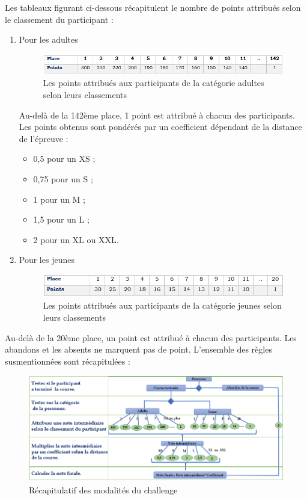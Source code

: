 	Les tableaux figurant ci-dessous récapitulent le nombre de points attribués selon le classement du participant :
	\begin{enumerate}
	   \item Pour les adultes
	\begin{figure}[h!]
	   \center
	   \includegraphics[scale=0.9]{img/points_categorie_adultes.png}
	   \caption {Les points attribués aux participants de la catégorie adultes selon leurs classements}
	\end{figure}
	
	Au-delà de la 142ème place, 1 point est attribué à chacun des participants. Les points obtenus sont pondérés par un coefficient dépendant de la distance de l’épreuve : 
	
	\begin{itemize} 
	 	\item 0,5 pour un XS ; 
	 	\item 0,75 pour un S ;
	 	\item 1 pour un M ;  
	 	\item 1,5 pour un L ;
	 	\item 2 pour un XL ou XXL.
	\end{itemize} 
	   \item Pour les jeunes
	\begin{figure}[!h]
	   \center
	   \includegraphics[scale=1]{img/points_categorie_jeunes.png}
	   \caption {Les points attribués aux participants de la catégorie jeunes selon leurs classements}
	\end{figure}
	
	\end{enumerate}

	\newpage
	Au-delà de la 20ème place, un point est attribué à chacun des participants. Les abandons et les absents ne marquent pas de point. 
	L’ensemble des règles susmentionnées sont récapitulées :
	\begin{figure}[!h]
	   \center
	   \includegraphics[scale=0.8]{img/recapitulatif_modalite_challenge.png}
	   \caption {Récapitulatif des modalités du challenge}
	\end{figure}
	
